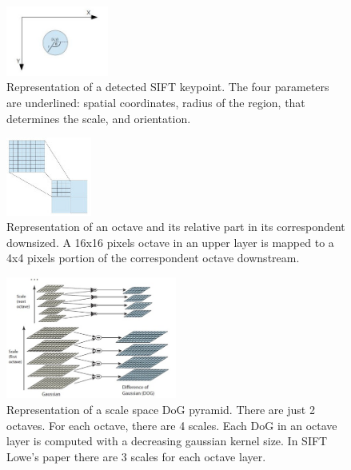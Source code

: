 \documentclass[aps,letterpaper,10pt]{revtex4}
\begin{document}
\begin{figure}[h]
	\begin{center}
		\includegraphics[width=0.3\textwidth]{imgs/detected_sift.jpg}
	\end{center}
\caption{Representation of a detected SIFT keypoint. The four parameters are underlined: spatial coordinates, radius of the region, that determines the scale, and orientation.}
\end{figure}

\begin{figure}[h]
	\begin{center}
		\includegraphics[width=0.25\textwidth]{imgs/octave_downsize.jpg}
	\end{center}
\caption{Representation of an octave and its relative part in its correspondent downsized. A 16x16 pixels octave in an upper layer is mapped to a 4x4 pixels portion of the correspondent octave downstream.}
\end{figure}

\begin{figure}[h]
	\begin{center}
		\includegraphics[width=0.5\textwidth]{imgs/dog_pyramid.jpg}
	\end{center}
\caption{Representation of a scale space DoG pyramid. There are just 2 octaves. For each octave, there are 4 scales. Each DoG in an octave layer is computed with a decreasing gaussian kernel size. In SIFT Lowe's paper there are 3 scales for each octave layer.}
\end{figure}
\end{document}
